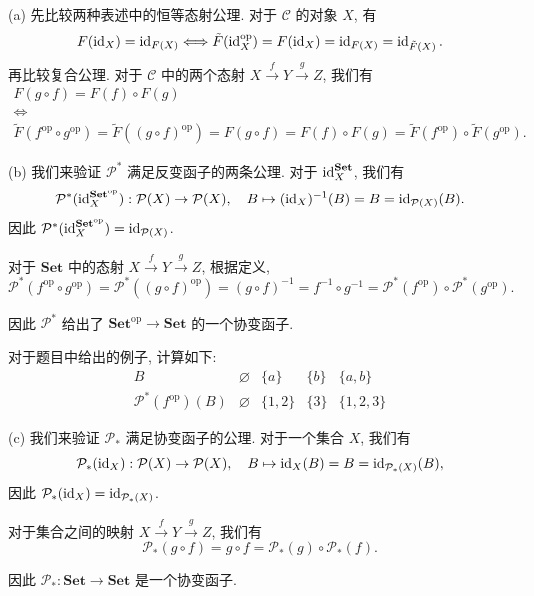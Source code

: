 \documentclass{article}
\newcommand{\op}{^{\mathrm{op}}}
\begin{document}
\begin{solution}
	(a) 先比较两种表述中的恒等态射公理. 对于 $\mathcal{C}$ 的对象 $X$, 有
	\[ F(\id_X) = \id_{F(X)} \Longleftrightarrow \tilde{F}(\id_X\op) = F(\id_X) = \id_{F(X)} = \id_{\tilde{F}(X)}. \]
	再比较复合公理. 对于 $\mathcal{C}$ 中的两个态射 $X \xrightarrow{f} Y \xrightarrow{g} Z$, 我们有
	\begin{gather*}
		F(g\circ f) = F(f) \circ F(g) \\
		\Longleftrightarrow \\
		\tilde{F}(f\op \circ g\op) 
		= \tilde{F}((g\circ f)\op) 
		= F(g\circ f) = F(f) \circ F(g)
		=\tilde{F}(f\op) \circ \tilde{F}(g\op).
	\end{gather*}

	(b) 我们来验证 $\mathcal{P}^*$ 满足反变函子的两条公理. 对于 $\operatorname{id}_X^{\mathbf{Set}}$, 我们有
	\[ \mathcal{P}^*(\id_X^{\mathbf{Set}\op}): \mathcal{P}(X) \to \mathcal{P}(X), \quad B \mapsto (\id_X)^{-1}(B) = B = \id_{\mathcal{P}(X)} (B). \]
	因此 $\mathcal{P}^*(\id_X^{\mathbf{Set}\op}) = \id_{\mathcal{P}(X)}$. 

	对于 $\mathbf{Set}$ 中的态射 $X \xrightarrow{f} Y \xrightarrow{g} Z$, 根据定义, 
	\[ \mathcal{P}^*(f\op \circ g\op) = \mathcal{P}^*((g\circ f)\op) = (g \circ f)^{-1} = f^{-1} \circ g^{-1} = \mathcal{P}^*(f\op) \circ \mathcal{P}^*(g\op). \]

	因此 $\mathcal{P}^*$ 给出了 $\mathbf{Set}\op \to \mathbf{Set}$ 的一个协变函子. 

	对于题目中给出的例子, 计算如下: 
	\[ \begin{array}{c|cccc}
		 B & \varnothing & \{a\} & \{b\} & \{a,b\} \\ \hline
		 \mathcal{P}^*(f\op)(B) & \varnothing & \{1,2\} & \{3\} &\{1,2,3\}
	\end{array} \]

	(c) 我们来验证 $\mathcal{P}_*$ 满足协变函子的公理. 对于一个集合 $X$, 我们有
	\[ \mathcal{P}_*(\operatorname{id}_X): \mathcal{P}(X) \to \mathcal{P}(X), \quad B \mapsto \operatorname{id}_X(B) = B = \operatorname{id}_{\mathcal{P}_*(X)}(B), \]
	因此 $\mathcal{P}_*(\operatorname{id}_X) = \operatorname{id}_{\mathcal{P}_*(X)}$. 

	对于集合之间的映射 $X \xrightarrow{f} Y \xrightarrow{g} Z$, 我们有
	\[ \mathcal{P}_*(g\circ f) = g \circ f = \mathcal{P}_*(g) \circ \mathcal{P}_*(f). \]

	因此 $\mathcal{P}_*: \mathbf{Set} \to \mathbf{Set}$ 是一个协变函子.
\end{solution}
\end{document}
